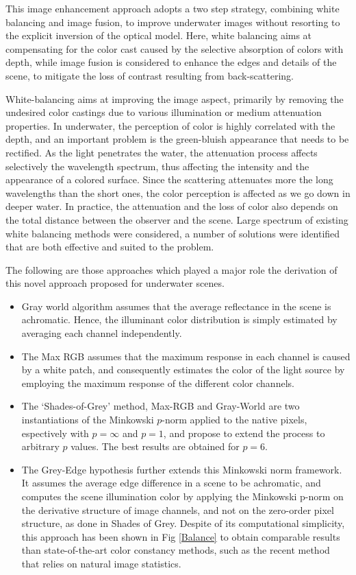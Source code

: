 \documentclass[hidelinks, 12pt]{report}
\begin{document}
\fancyfoot[RE,RO]{\footnotesize\thepage}
 
\justify
This image enhancement approach adopts a two step strategy, combining white balancing and image fusion, to improve underwater images without resorting to the explicit inversion of the optical model. Here, white balancing aims at compensating for the color cast caused by the selective absorption of colors with depth, while image fusion is considered to enhance the edges and details of the scene, to mitigate the loss of contrast resulting from back-scattering. \par 
White-balancing aims at improving the image aspect, primarily by removing the undesired color castings due to various illumination or medium attenuation properties. In underwater, the perception of color is highly correlated with the depth, and an important problem is the green-bluish appearance that needs to be rectified. As the light penetrates the water, the attenuation process affects selectively the wavelength spectrum, thus affecting the intensity and the appearance of a colored surface. Since the scattering attenuates more the long wavelengths than the short ones, the color perception is affected as we go down in deeper water. In practice, the attenuation and the loss of color also depends on the total distance between the observer and the scene. Large spectrum of existing white balancing methods were considered, a number of solutions were identified that are both effective and suited to the problem. \par
The following are those approaches which played a major role the derivation of this novel approach proposed for underwater scenes.
\begin{itemize}
\item{Gray world algorithm assumes that the average reflectance in the scene is achromatic. Hence, the illuminant color distribution is simply estimated by averaging each channel independently.}
\item{The Max RGB assumes that the maximum response in each channel is caused by a white patch, and consequently estimates the color of the light source by employing the maximum response of the different color channels.}
\item{The ‘Shades-of-Grey’ method, Max-RGB and Gray-World are two instantiations of the Minkowski $p$-norm applied to the native pixels,  espectively with $p=\infty$ and $p=1$, and propose to extend the process to arbitrary $p$ values. The best results are obtained for $p=6$.}
\item{The Grey-Edge hypothesis further extends this Minkowski norm framework. It assumes the average edge difference in a scene to be achromatic, and computes the scene illumination color by applying the Minkowski p-norm on the derivative structure of image channels, and not on the zero-order pixel structure, as done in Shades of Grey. Despite of its computational simplicity, this approach has been shown in Fig \ref{Balance} to obtain comparable results than state-of-the-art color constancy methods, such as the recent method that relies on natural image statistics.}
\end{itemize}
\end{document}
